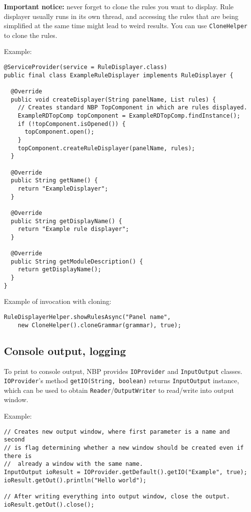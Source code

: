 \documentclass[a4paper,10pt,oneside]{article}
\begin{document}
\par 
  \textbf{Important notice:} never forget to clone the rules you want
  to display. Rule displayer usually runs in its own thread, and accessing the
  rules that are being simplified at the same time might lead to weird results.
  You can use \texttt{CloneHelper} to clone the rules.


Example:
\begin{verbatim}
@ServiceProvider(service = RuleDisplayer.class)
public final class ExampleRuleDisplayer implements RuleDisplayer {

  @Override
  public void createDisplayer(String panelName, List rules) {
    // Creates standard NBP TopComponent in which are rules displayed.
    ExampleRDTopComp topComponent = ExampleRDTopComp.findInstance();
    if (!topComponent.isOpened()) {
      topComponent.open();
    }
    topComponent.createRuleDisplayer(panelName, rules);
  }

  @Override
  public String getName() {
    return "ExampleDisplayer";
  }

  @Override
  public String getDisplayName() {
    return "Example rule displayer";
  }

  @Override
  public String getModuleDescription() {
    return getDisplayName();
  }
}
\end{verbatim}



Example of invocation with cloning:
\begin{verbatim}
RuleDisplayerHelper.showRulesAsync("Panel name",
    new CloneHelper().cloneGrammar(grammar), true);
\end{verbatim}

\subsection*{Console output, logging}

\par 
  To print to console output, NBP provides
  \texttt{IOProvider}
  and \texttt{InputOutput}
  classes. \texttt{IOProvider}'s method \texttt{getIO(String, boolean)}
  returns \texttt{InputOutput} instance, which can be used to obtain
  \texttt{Reader}/\texttt{OutputWriter} to read/write into output window.


Example:
\begin{verbatim}
// Creates new output window, where first parameter is a name and second
// is flag determining whether a new window should be created even if there is
//  already a window with the same name.
InputOutput ioResult = IOProvider.getDefault().getIO("Example", true);
ioResult.getOut().println("Hello world");

// After writing everything into output window, close the output.
ioResult.getOut().close();
\end{verbatim}
\end{document}
